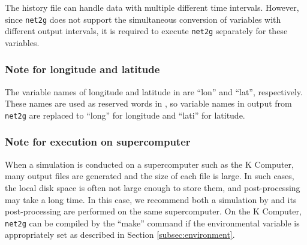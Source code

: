 The history file can handle data with multiple different time intervals.
However, since \verb|net2g| does not support the simultaneous conversion of variables with different output intervals,
it is required to execute \verb|net2g| separately for these variables.


\subsubsection{Note for longitude and latitude}
The variable names of longitude and latitude in \scalerm are ``lon'' and ``lat'', respectively.
These names are used as reserved words in \grads,
so variable names in output from \verb|net2g| are replaced to ``long'' for longitude and ``lati'' for latitude.


\subsubsection{Note for execution on supercomputer}
When a simulation is conducted on a supercomputer such as the K Computer, many output files are generated and the size of each file is large.
In such cases, the local disk space is often not large enough to store them, and post-processing may take a long time.
In this case, we recommend both a simulation by \scalerm and its post-processing are performed on the same supercomputer.
On the K Computer, \verb|net2g| can be compiled by the ``make'' command  if the environmental variable is appropriately set as described in Section \ref{subsec:environment}.
